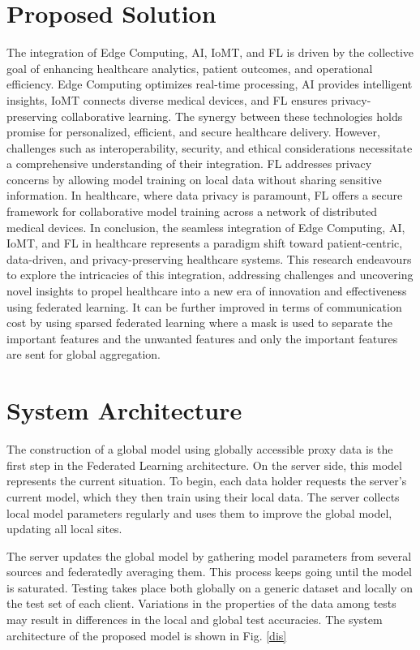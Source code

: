 \documentclass[conference]{IEEEtran}
\begin{document}
\section{Proposed Solution}
The integration of Edge Computing, AI, IoMT, and FL is driven by the collective goal of enhancing healthcare analytics, patient outcomes, and operational efficiency. Edge Computing optimizes real-time processing, AI provides intelligent insights, IoMT connects diverse medical devices, and FL ensures privacy-preserving collaborative learning. The synergy between these technologies holds promise for personalized, efficient, and secure healthcare delivery. However, challenges such as interoperability, security, and ethical considerations necessitate a comprehensive understanding of their integration. FL addresses privacy concerns by allowing model training on local data without sharing sensitive information. In healthcare, where data privacy is paramount, FL offers a secure framework for collaborative model training across a network of distributed medical devices. In conclusion, the seamless integration of Edge Computing, AI, IoMT, and FL in healthcare represents a paradigm shift toward patient-centric, data-driven, and privacy-preserving healthcare systems. This research endeavours to explore the intricacies of this integration, addressing challenges and uncovering novel insights to propel healthcare into a new era of innovation and effectiveness using federated learning. It can be further improved in terms of communication cost by using sparsed federated learning where a mask is used to separate the important features and the unwanted features and only the important features are sent for global aggregation.

\section{System Architecture}
The construction of a global model using globally accessible proxy data is the first step in the Federated Learning architecture. On the server side, this model represents the current situation. To begin, each data holder requests the server's current model, which they then train using their local data. The server collects local model parameters regularly and uses them to improve the global model, updating all local sites. 

The server updates the global model by gathering model parameters from several sources and federatedly averaging them. This process keeps going until the model is saturated. Testing takes place both globally on a generic dataset and locally on the test set of each client. Variations in the properties of the data among tests may result in differences in the local and global test accuracies. The system architecture of the proposed model is shown in Fig. \ref{dis}
\end{document}
